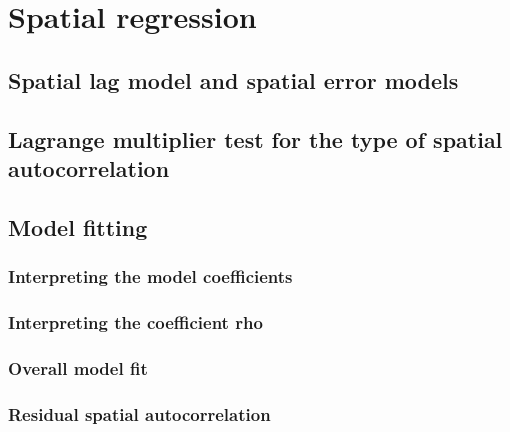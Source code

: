 \documentclass[]{book}
\begin{document}
\hypertarget{spatial-regression}{%
\section{Spatial regression}\label{spatial-regression}}

\hypertarget{spatial-lag-model-and-spatial-error-models}{%
\subsection{Spatial lag model and spatial error models}\label{spatial-lag-model-and-spatial-error-models}}

\hypertarget{lagrange-multiplier-test-for-the-type-of-spatial-autocorrelation}{%
\subsection{Lagrange multiplier test for the type of spatial autocorrelation}\label{lagrange-multiplier-test-for-the-type-of-spatial-autocorrelation}}

\hypertarget{model-fitting}{%
\subsection{Model fitting}\label{model-fitting}}

\hypertarget{interpreting-the-model-coefficients}{%
\subsubsection{Interpreting the model coefficients}\label{interpreting-the-model-coefficients}}

\hypertarget{interpreting-the-coefficient-rho}{%
\subsubsection{Interpreting the coefficient rho}\label{interpreting-the-coefficient-rho}}

\hypertarget{overall-model-fit}{%
\subsubsection{Overall model fit}\label{overall-model-fit}}

\hypertarget{residual-spatial-autocorrelation}{%
\subsubsection{Residual spatial autocorrelation}\label{residual-spatial-autocorrelation}}
\end{document}
